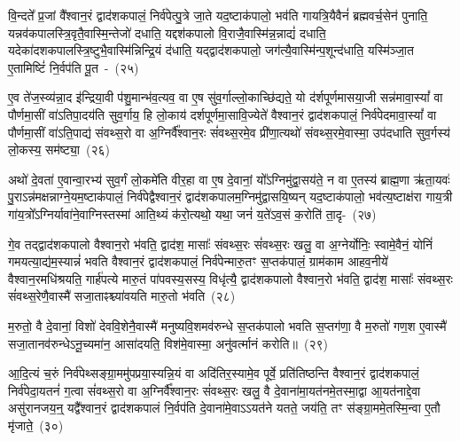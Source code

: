वि॒न्दते᳚ प्र॒जां वै᳚श्वान॒रं द्वाद॑श\-कपालं॒ निर्व॑पेत्पु॒त्रे जा॒ते यद॒ष्टाक॑पालो॒ भव॑ति गायत्रि॒यैवैनं॑ ब्रह्मवर्च॒सेन॑ पुनाति॒ यन्नव॑कपालस्त्रि॒वृतै॒वास्मि॒न्तेजो॑ दधाति॒ यद्दश॑\-कपालो वि॒राजै॒वास्मि॑न्न॒न्नाद्यं॑ दधाति॒ यदेका॑\-दश\-कपालस्त्रि॒ष्टुभै॒वा\-स्मि॑न्निन्द्रि॒यं द॑धाति॒ यद्द्वाद॑श\-कपालो॒ जग॑त्यै॒वास्मि॑न्प॒शून्द॑\-धाति॒ यस्मि॑ञ्जा॒त ए॒तामिष्टिं॑ नि॒र्वप॑ति पू॒त~-~(२५)

ए॒व ते॑ज॒स्व्य॑न्ना॒द इ॑न्द्रिया॒वी प॑शु॒मान्भ॑व॒त्यव॒ वा ए॒ष सु॑व॒र्गाल्लो॒काच्छि॑द्यते॒ यो द॑र्\mbox{}शपूर्णमासया॒जी सन्न॑मावा॒स्यां᳚ वा पौर्णमा॒सीं वा॑\-ऽतिपा॒दय॑ति सुव॒र्गाय॒ हि लो॒काय॑ दर्\mbox{}श\-पूर्ण\-मा॒सावि॒ज्येते॑ वैश्वान॒रं द्वाद॑श\-कपालं॒ निर्व॑पेदमावा॒स्यां᳚ वा पौर्णमा॒सीं वा॑\-ऽति॒पाद्य॑ संवथ्स॒रो वा अ॒ग्निर्वै᳚श्वान॒रः सं॑वथ्स॒रमे॒व प्री॑णा॒त्यथो॑ संवथ्स॒रमे॒वास्मा॒ उप॑दधाति सुव॒र्गस्य॑ लो॒कस्य॒ सम॑ष्ट्या॒~(२६)

अथो॑ दे॒वता॑ ए॒वान्वा॒रभ्य॑ सुव॒र्गं लो॒कमे॑ति वीर॒हा वा ए॒ष दे॒वानां॒ यो᳚\-ऽग्निमु॑द्वा॒सय॑ते॒ न वा ए॒तस्य॑ ब्राह्म॒णा ऋ॑ता॒यवः॑ पु॒रा\-ऽन्न॑मक्षन्नाग्ने॒यम॒ष्टा\-क॑पालं॒ निर्व॑पेद्वैश्वान॒रं द्वाद॑श\-कपालम॒ग्नि\-मु॑द्वासयि॒ष्यन् यद॒ष्टाक॑पालो॒ भव॑त्य॒ष्टाक्ष॑रा गाय॒त्री गा॑य॒त्रो᳚\-ऽग्निर्यावा॑ने॒वाग्निस्तस्मा॑ आति॒थ्यं क॑रो॒त्यथो॒ यथा॒ जनं॑ य॒ते॑\-ऽव॒सं क॒रोति॑ ता॒दृ-~(२७)

गे॒व तद्द्वाद॑श\-कपालो वैश्वान॒रो भ॑वति॒ द्वाद॑श॒ मासाः᳚ संवथ्स॒रः सं॑वथ्स॒रः खलु॒ वा अ॒ग्नेर्योनिः॒ स्वामे॒वैनं॒ योनिं॑ गमयत्या॒द्य॑म॒स्यान्नं॑ भवति वैश्वान॒रं द्वाद॑श\-कपालं॒ निर्व॑पेन्मारु॒तꣳ स॒प्तक॑पालं॒ ग्राम॑काम आहव॒नीये॑ वैश्वान॒रमधि॑श्रयति॒ गार्\mbox{}ह॑पत्ये मारु॒तं पा॑पवस्य॒सस्य॒ विधृ॑त्यै॒ द्वाद॑श\-कपालो वैश्वान॒रो भ॑वति॒ द्वाद॑श॒ मासाः᳚ संवथ्स॒रः सं॑वथ्स॒रेणै॒वास्मै॑ सजा॒ताꣴश्च्या॑वयति मारु॒तो भ॑वति~(२८)

म॒रुतो॒ वै दे॒वानां॒ विशो॑ देववि॒शेनै॒वास्मै॑ मनुष्यवि॒शमव॑\-रुन्धे स॒प्तक॑पालो भवति स॒प्तग॑णा॒ वै म॒रुतो॑ गण॒श ए॒वास्मै॑ सजा॒तानव॑\-रुन्धे\-ऽनू॒च्यमा॑न॒ आसा॑दयति॒ विश॑मे॒वास्मा॒ अनु॑वर्त्मानं करोति॥~(२९)

{\anuvakamend[{प्र॒जाका॑मः संवथ्स॒रः पु॒नात्ये॒वैनं॑ पू॒तः सम॑ष्ट्यै ता॒दृङ्मा॑रु॒तो भ॑व॒त्येका॒न्नत्रि॒ꣳ॒शच्च॑}]}%

आ॒दि॒त्यं च॒रुं निर्व॑पेथ्सङ्ग्रा॒ममु॑पप्रया॒स्यन्नि॒यं वा अदि॑तिर॒स्या\-मे॒व पूर्वे॒ प्रति॑तिष्ठन्ति वैश्वान॒रं द्वाद॑श\-कपालं॒ निर्व॑पेदा॒यतनं॑ ग॒त्वा सं॑वथ्स॒रो वा अ॒ग्निर्वै᳚श्वान॒रः सं॑वथ्स॒रः खलु॒ वै दे॒वाना॑मा॒यत॑नमे॒तस्मा॒द्वा आ॒यत॑नाद्दे॒वा असु॑रानजय॒न्॒ यद्वै᳚श्वान॒रं द्वाद॑श\-कपालं नि॒र्वप॑ति दे॒वाना॑\-मे॒वा\-ऽऽ\-\-यत॑ने यतते॒ जय॑ति॒ तꣳ स॑ङ्ग्रा॒ममे॒तस्मि॒न्वा ए॒तौ मृ॑जाते॒~(३०)

